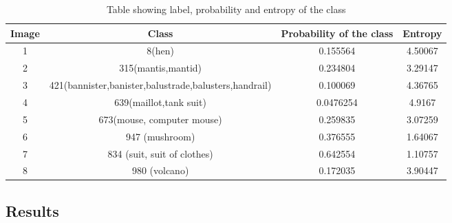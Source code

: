 \documentclass[conference]{IEEEtran}
\begin{document}
%


%




\begin{table*}
\caption{Table showing label, probability and entropy of the class}
\centering
\begin{tabular}{|c|c|c|c|}
\hline 
Image & Class & Probability of the class & Entropy \\ 
\hline 
1 & 8(hen) & 0.155564 & 4.50067 \\ 
\hline 
2 & 315(mantis,mantid) & 0.234804 & 3.29147 \\ 
\hline 
3 & 421(bannister,banister,balustrade,balusters,handrail) & 0.100069 & 4.36765 \\ 
\hline 
4 & 639(maillot,tank suit) & 0.0476254 & 4.9167 \\ 
\hline 
5 & 673(mouse, computer mouse) & 0.259835 & 3.07259 \\ 
\hline 
6 & 947 (mushroom) & 0.376555 & 1.64067 \\ 
\hline 
7 & 834 (suit, suit of clothes) & 0.642554 & 1.10757 \\ 
\hline 
8 & 980 (volcano) & 0.172035 & 3.90447 \\ 
\hline 
\end{tabular} 
\end{table*}

\newpage

\subsection{Results}
\end{document}
